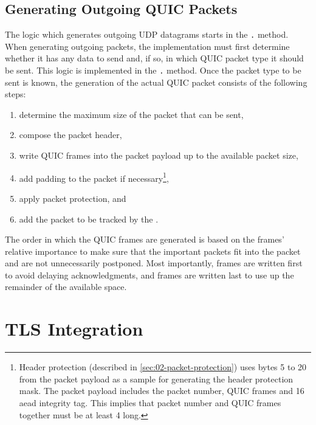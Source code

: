 \subsection{Generating Outgoing QUIC Packets}

The logic which generates outgoing UDP datagrams starts in the
\texttt{\ManagedQuicConnection{}.} method. When generating outgoing packets, the
implementation must first determine whether it has any data to send and, if so, in which QUIC packet
type it should be sent. This logic is implemented in the
\texttt{\ManagedQuicConnection{}.} method. Once the packet type to be sent is
known, the generation of the actual QUIC packet consists of the following steps:

\begin{enumerate}

  \item determine the maximum size of the packet that can be sent,

  \item compose the packet header,

  \item write QUIC frames into the packet payload up to the available packet size,

  \item add padding to the packet if necessary\footnote{Header protection (described in
\autoref{sec:02-packet-protection}) uses bytes 5 to 20 from the packet payload as a sample for
generating the header protection mask. The packet payload includes the packet number, QUIC frames
and \SI{16}{\byte} \gls{aead} integrity tag. This implies that packet number and QUIC frames
together must be at least \SI{4}{\byte} long.},

  \item apply packet protection, and

  \item add the packet to be tracked by the \RecoveryController{}.

\end{enumerate}

The order in which the QUIC frames are generated is based on the frames' relative importance to make
sure that the important packets fit into the packet and are not unnecessarily postponed. Most
importantly, \ACK{} frames are written first to avoid delaying acknowledgments, and \STREAM{} frames
are written last to use up the remainder of the available space.

\section{TLS Integration}

